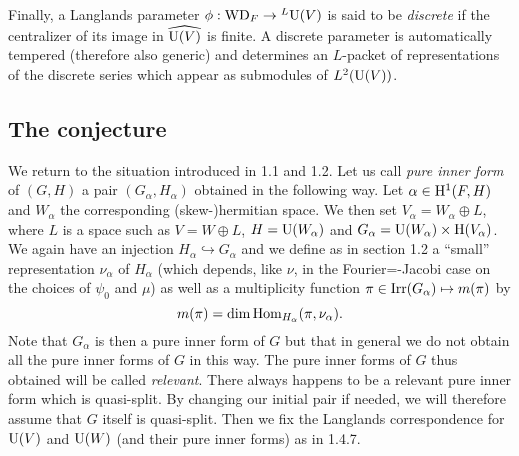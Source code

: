 Finally, a Langlands parameter $\phi: \mathrm{WD}_F \to {}^L \mathrm{U}(V)$ is said to be \emph{discrete} if the centralizer of its image in $\widehat{\mathrm{U}(V)}$ is finite.
A discrete parameter is automatically tempered (therefore also generic) and determines an $L$-packet of representations of the discrete series which appear as submodules of $L^2(\mathrm{U}(V))$.



\subsection{The conjecture}



We return to the situation introduced in 1.1 and 1.2.
Let us call \emph{pure inner form} of $(G, H)$ a pair $(G_\alpha,H_\alpha)$ obtained in the following way.
Let $\alpha \in \mathrm{H}^1(F, H)$ and $W_\alpha$ the corresponding (skew-)hermitian space.
We then set $V_\alpha = W_\alpha \oplus L$, where $L$ is a space such as $V = W \oplus L$, $H = \mathrm{U}(W_\alpha)$ and $G_\alpha = \mathrm{U}(W_\alpha) \times \mathrm{H}(V_\alpha)$.
We again have an injection $H_\alpha \hookrightarrow G_\alpha$ and we define as in section 1.2 a “small” representation $\nu_\alpha$ of $H_\alpha$ (which depends, like $\nu$, in the Fourier=-Jacobi case on the choices of $\psi_0$ and $\mu$) as well as a multiplicity function $\pi\in \mathrm{Irr}(G_\alpha) \mapsto m(\pi)$ by
\[
    m(\pi) = \dim \mathrm{Hom}_{H_\alpha} (\pi, \nu_\alpha).
\]
Note that $G_\alpha$ is then a pure inner form of $G$ but that in general we do not obtain all the pure inner forms of $G$ in this way.
The pure inner forms of $G$ thus obtained will be called \emph{relevant}.
There always happens to be a relevant pure inner form which is quasi-split.
By changing our initial pair if needed, we will therefore assume that $G$ itself is quasi-split.
Then we fix the Langlands correspondence for $\mathrm{U}(V)$ and $\mathrm{U}(W)$ (and their pure inner forms) as in 1.4.7.

